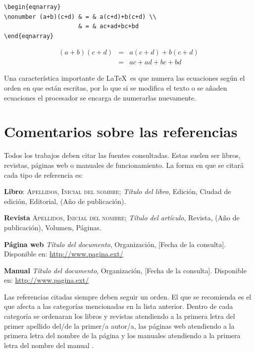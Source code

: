 \documentclass[10pt,a4paper]{article}
\begin{document}
\begin{table}[ht!]
\begin{minipage}{0.5\textwidth}
\begin{verbatim}
\begin{eqnarray}
\nonumber (a+b)(c+d) & = & a(c+d)+b(c+d) \\ 
                     & = & ac+ad+bc+bd    
\end{eqnarray}
\end{verbatim}
\end{minipage}
%
\begin{minipage}{0.5\textwidth}
\begin{eqnarray}
\nonumber (a+b)(c+d) & = & a(c+d)+b(c+d) \\ 
                     & = & ac+ad+bc+bd    
\end{eqnarray}
\caption[Comando \texttt{nonumber}]{Código \texttt{nonumber}}
%
\end{minipage}
\end{table}

\bigskip

 Una característica importante de \LaTeX\ es que numera las ecuaciones según el orden en que están escritas, por lo que si se modifica el texto o se añaden ecuaciones el procesador se encarga de numerarlas nuevamente. 

\vspace{1cm}

\section{Comentarios sobre las referencias}
\label{comentarios_referencias}

Todos los trabajos deben citar las fuentes consultadas. Estas suelen ser libros, revistas, páginas web o manuales de funcionamiento. La forma en que se citará cada tipo de referencia es:

\noindent{}\textbf{Libro}: \textsc{Apellidos, Inicial del nombre}; \textit{Título del libro}, Edición, Ciudad de edición, Editorial, (Año de publicación).

\noindent{}\textbf{Revista} \textsc{Apellidos, Inicial del nombre}; \emph{Título del artículo}, Revista, (Año de publicación), Volumen, Páginas.

\noindent{}\textbf{Página web} \textit{Título del documento}, Organización, [Fecha de la consulta]. Disponible en: \url{http://www.pagina.ext/}

\noindent{}\textbf{Manual} \textit{Título del documento}, Organización, [Fecha de la consulta]. Disponible en: \url{http://www.pagina.ext/}

						
\bigskip

Las referencias citadas siempre deben seguir un orden. El que se recomienda es el que afecta a las categorías mencionadas en la lista anterior. Dentro de cada categoría se ordenaran los libros y revistas atendiendo a la primera letra del primer apellido del/de la primer/a autor/a, las páginas web atendiendo a la primera letra del nombre de la página y los manuales atendiendo a la primera letra del nombre del manual \cite{CalvoRolle201537}. 
\end{document}
